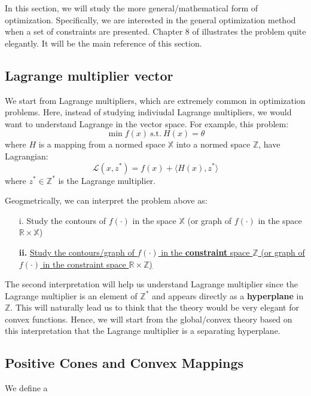 In this section, we will study the more general/mathematical form of optimization. Specifically, we are interested in the general optimization method when a set of constraints are presented.
Chapter 8 of \citet{luenberger1997optimization} illustrates the problem quite elegantly. It will be the main reference of this section.

\subsection{Lagrange multiplier vector}
We start from Lagrange multipliers, which are extremely common in optimization problems. Here, instead of studying indiviudal Lagrange multipliers, we would want to understand Lagrange in the vector space. For example, this problem:
$$\min f(x)\ \text{s.t.}\ H(x)=\theta$$
where $H$ is a mapping from a normed space $\mathbb{X}$ into a normed space $\mathbb{Z}$, have Lagrangian:
$$\mathcal{L}(x,z^*)=f(x)+\langle H(x),z^*\rangle$$
where $z^*\in \mathbb{Z}^*$ is the Lagrange multiplier. 

Geogmetrically, we can interpret the problem above as:
\begin{enumerate}
    \item[i.] Study the contours of $f(\cdot)$ in the space $\mathbb{X}$ (or graph of $f(\cdot)$ in the space $\mathbb{R}\times \mathbb{X}$)
    \item[\textbf{ii.}] \underline{Study the contours/graph of $f(\cdot)$ in the \textbf{constraint} space $\mathbb{Z}$ (or graph of $f(\cdot)$ in the constraint space $\mathbb{R}\times \mathbb{Z}$)}
\end{enumerate}

The second interpretation will help us understand Lagrange multiplier since the Lagrange multiplier is an element of $\mathbb{Z}^*$ and appears directly as a \textbf{hyperplane} in $\mathbb{Z}$.
This will naturally lead us to think that the theory would be very elegant for convex functions. Hence, we will start from the global/convex theory based on this interpretation that the Lagrange multiplier is a separating hyperplane.

\subsection{Positive Cones and Convex Mappings}
We define a 
